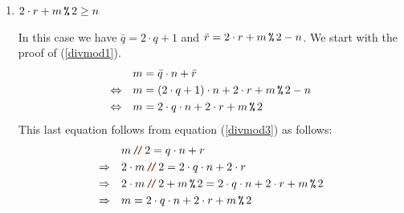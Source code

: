 \begin{enumerate}
\begin{enumerate}
    In this case we have $\bar{q} = 2 \cdot q$ and $\bar{r} = 2 \cdot r + m \mmod 2$.
    In order to prove (\ref{divmod1}) we note the following:
    \begin{align}
                           &  m = \bar{q} \cdot n + \bar{r} \\
      \Leftrightarrow\quad & m = 2 \cdot q \cdot n + 2 \cdot r + m \mmod 2 \label{divmod5}
    \end{align}
    We will derive equation (\ref{divmod5}) from equation (\ref{divmod3}).  To this end, we multiply equation
    (\ref{divmod3}) by $2$.  This yields:
    \\[0.2cm]
    \hspace*{1.3cm}
    $2 \cdot m \dv 2 = 2 \cdot q \cdot n + 2 \cdot r$.
    \\[0.2cm]
    If we add $m \mmod 2$ to this equation we get
    \\[0.2cm]
    \hspace*{1.3cm}
    $2 \cdot m \dv 2 + m \mmod 2 = 2 \cdot q \cdot n + 2 \cdot r + m \mmod 2$.
    \\[0.2cm]
    As we have $2 \cdot m \dv 2 + m \mmod 2 = m$ the last equation can be simplified to
    \\[0.2cm]
    \hspace*{1.3cm}
    $m = 2 \cdot q \cdot n + 2 \cdot r + m \mmod 2$.
    \\[0.2cm]
    However, this is just equation (\ref{divmod5}) which we had to prove. \mycheck

    Next, we show that $\bar{r} < n$.  This is equivalent to
    \\[0.2cm]
    \hspace*{1.3cm}
    $2 \cdot r + m \mmod 2 < n$.
    \\[0.2cm]
    However, this inequation is the condition of this case of the case distinction and is therefore valid. \mycheck
  \item $2 \cdot r + m \,\texttt{\%}\, 2 \geq n$

    In this case we have $\bar{q} = 2 \cdot q + 1$ and $\bar{r} = 2 \cdot r + m \,\texttt{\%}\, 2 - n$.
    We start with the proof of (\ref{divmod1}).
    \begin{align*}
                           & m = \bar{q} \cdot n + \bar{r} \\
      \Leftrightarrow\quad & m = (2 \cdot q + 1) \cdot n + 2 \cdot r + m \,\texttt{\%}\, 2 - n \\
      \Leftrightarrow\quad & m = 2 \cdot q \cdot n + 2 \cdot r + m \,\texttt{\%}\, 2 
    \end{align*}
    This last equation follows from equation (\ref{divmod3}) as follows:
    \begin{align*}
                       & m \dv 2 = q \cdot n + r \\
      \Rightarrow\quad & 2 \cdot m \dv 2 = 2 \cdot q \cdot n + 2 \cdot r \\
      \Rightarrow\quad & 2 \cdot m \dv 2 + m \mmod 2 = 2 \cdot q \cdot n + 2 \cdot r + m \mmod 2 \\
      \Rightarrow\quad & m = 2 \cdot q \cdot n + 2 \cdot r + m \mmod 2 
    \end{align*}


\end{enumerate}
\end{enumerate}
